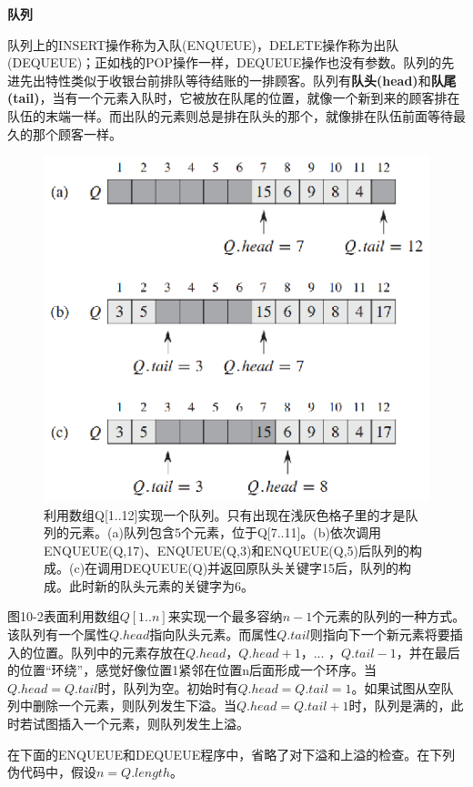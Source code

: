 \documentclass[a4paper,11pt]{ctexbook}
\begin{document}
\textbf{队列}

队列上的INSERT操作称为入队(ENQUEUE)，DELETE操作称为出队(DEQUEUE)；正如栈的POP操作一样，DEQUEUE操作也没有参数。队列的先进先出特性类似于收银台前排队等待结账的一排顾客。队列有\textbf{队头(head)}和\textbf{队尾(tail)}，当有一个元素入队时，它被放在队尾的位置，就像一个新到来的顾客排在队伍的末端一样。而出队的元素则总是排在队头的那个，就像排在队伍前面等待最久的那个顾客一样。
\begin{figure}[htbp]	
	\begin{center}
		\includegraphics{figure/10.2.eps}	
		\caption{利用数组Q[1..12]实现一个队列。只有出现在浅灰色格子里的才是队列的元素。(a)队列包含5个元素，位于Q[7..11]。(b)依次调用ENQUEUE(Q,17)、ENQUEUE(Q,3)和ENQUEUE(Q,5)后队列的构成。(c)在调用DEQUEUE(Q)并返回原队头关键字15后，队列的构成。此时新的队头元素的关键字为6。}
	\end{center}	
\end{figure}

图10-2表面利用数组$ Q[1..n] $来实现一个最多容纳$ n-1 $个元素的队列的一种方式。该队列有一个属性$ Q.head $指向队头元素。而属性$ Q.tail $则指向下一个新元素将要插入的位置。队列中的元素存放在$ Q.head $，$ Q.head + 1 $，... ，$Q.tail-1$，并在最后的位置“环绕”，感觉好像位置1紧邻在位置n后面形成一个环序。当$ Q.head = Q.tail $时，队列为空。初始时有$ Q.head = Q.tail = 1 $。如果试图从空队列中删除一个元素，则队列发生下溢。当$ Q.head = Q.tail + 1 $时，队列是满的，此时若试图插入一个元素，则队列发生上溢。

在下面的ENQUEUE和DEQUEUE程序中，省略了对下溢和上溢的检查。在下列伪代码中，假设$ n = Q.length $。
\end{document}
